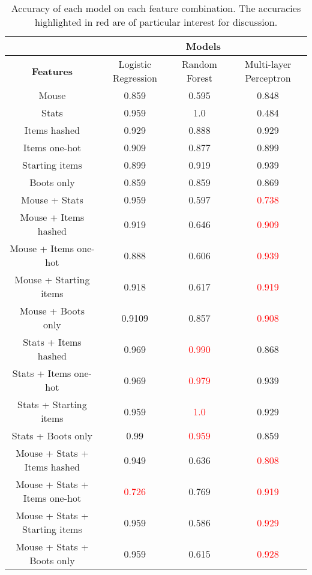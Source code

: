 \documentclass[Report.tex]{subfiles}
\begin{document}
\begin{table}[H]
\begin{tabular}{ c | c | c | c }
& \multicolumn{3}{c}{\textbf{Models}} \\ \hline
\textbf{Features} & Logistic Regression & Random Forest & Multi-layer Perceptron \\ \hline
Mouse & 0.859 & 0.595 & 0.848 \\ \hline
Stats & 0.959 & 1.0 & 0.484 \\ \hline
Items hashed & 0.929 & 0.888 & 0.929 \\ \hline
Items one-hot & 0.909 & 0.877 & 0.899 \\ \hline
Starting items & 0.899 & 0.919 & 0.939 \\ \hline
Boots only & 0.859 & 0.859 & 0.869 \\ \hline
Mouse + Stats & 0.959 & 0.597 & \textcolor{red}{0.738} \\ \hline
Mouse + Items hashed & 0.919 & 0.646 & \textcolor{red}{0.909} \\ \hline
Mouse + Items one-hot & 0.888 & 0.606 & \textcolor{red}{0.939} \\ \hline
Mouse + Starting items & 0.918 & 0.617 & \textcolor{red}{0.919} \\ \hline
Mouse + Boots only & 0.9109 & 0.857 & \textcolor{red}{0.908} \\ \hline
Stats + Items hashed & 0.969 & \textcolor{red}{0.990} & 0.868 \\ \hline
Stats + Items one-hot & 0.969 & \textcolor{red}{0.979} & 0.939 \\ \hline
Stats + Starting items & 0.959 & \textcolor{red}{1.0} & 0.929 \\ \hline
Stats + Boots only & 0.99 & \textcolor{red}{0.959} & 0.859 \\ \hline
Mouse + Stats + Items hashed & 0.949 & 0.636 & \textcolor{red}{0.808} \\ \hline
Mouse + Stats + Items one-hot & \textcolor{red}{0.726} & 0.769 & \textcolor{red}{0.919} \\ \hline
Mouse + Stats + Starting items & 0.959 & 0.586 & \textcolor{red}{0.929} \\ \hline
Mouse + Stats + Boots only & 0.959 & 0.615 & \textcolor{red}{0.928} \\
\end{tabular}
\caption{Accuracy of each model on each feature combination. The accuracies highlighted in red are of particular interest for discussion.}
\label{tbl:game-combination}
\end{table}
\end{document}
